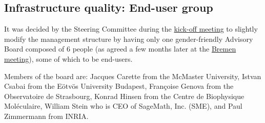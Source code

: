 


\subsection{Infrastructure quality: End-user group}


It was decided by the Steering Committee during the
\href{http://opendreamkit.org/meetings/2015-09-02-Kickoff/management_structure/}{kick-off
  meeting} to slightly modify the management structure by having only
one gender-friendly Advisory Board composed of 6 people (as agreed a
few months later at the
\href{http://opendreamkit.org/meetings/2016-06-27-Bremen/minutes/}{Bremen
  meeting}), some of which to be end-users.

Members of the board are: Jacques Carette from the McMaster University, Istvan Csabai from the Eötvös University Budapest,
Françoise Genova from the Observatoire de Strasbourg, Konrad Hinsen from the Centre de Biophysique Moléculaire,
William Stein who is CEO of SageMath, Inc. (SME), and Paul Zimmermann from INRIA.

